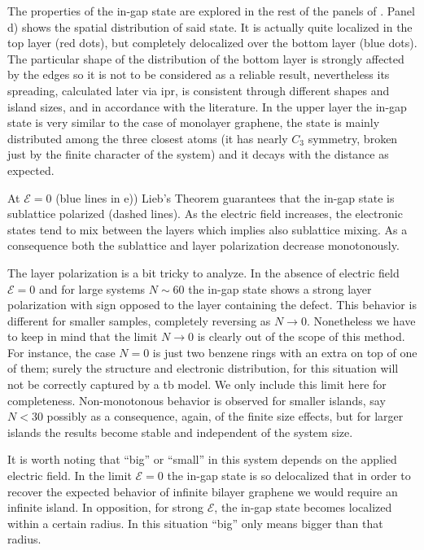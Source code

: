 The properties of the in-gap state are explored in the rest of the panels of . Panel d) shows the spatial distribution of said state. It is actually quite localized in the top layer (red dots), but completely delocalized over the bottom layer (blue dots).
The particular shape of the distribution of the bottom layer is strongly affected by the edges so it is not to be considered as a reliable result, nevertheless its spreading, calculated later via \ac{ipr}, is consistent through different shapes and island sizes, and in accordance with the literature\cite{Castro2010}.
In the upper layer the in-gap state is very similar to the case of monolayer graphene, the state is mainly distributed among the three closest atoms (it has nearly $C_3$ symmetry, broken just by the finite character of the system) and it decays with the distance as expected.

At $\mathcal{E}=0$ (blue lines in e)) Lieb's Theorem guarantees that the in-gap state is sublattice polarized (dashed lines). As the electric field increases, the electronic states tend to mix between the layers which implies also sublattice mixing. As a consequence both the sublattice and layer polarization decrease monotonously.

The layer polarization is a bit tricky to analyze. In the absence of electric field $\mathcal{E}=0$ and for large systems $N\sim60$ the in-gap state shows a strong layer polarization with sign opposed to the layer containing the defect. This behavior is different for smaller samples, completely reversing as $N\to0$. Nonetheless we have to keep in mind that the limit $N\to0$ is clearly out of the scope of this method. For instance, the case $N=0$ is just two benzene rings with an extra  on top of one of them; surely the structure and electronic distribution, for this situation will not be correctly captured by a \ac{tb} model. We only include this limit here for completeness.
Non-monotonous behavior is observed for smaller islands, say $N<30$ possibly as a consequence, again, of the finite size effects, but for larger islands the results become stable and independent of the system size.

It is worth noting that ``big'' or ``small'' in this system depends on the applied electric field. In the limit $\mathcal{E}=0$ the in-gap state is so delocalized that in order to recover the expected behavior of infinite bilayer graphene we would require an infinite island. In opposition, for strong $\mathcal{E}$, the in-gap state becomes localized within a certain radius. In this situation ``big'' only means bigger than that radius.


